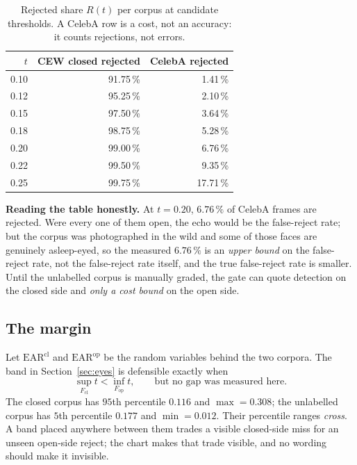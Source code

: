 \documentclass[11pt,a4paper]{article}
\begin{document}
\begin{table}[H]
\centering
\caption{Rejected share $R(t)$ per corpus at candidate thresholds. A
CelebA row is a cost, not an accuracy: it counts rejections, not errors.}
\label{tab:thresholds}
\renewcommand{\arraystretch}{1.25}
\begin{tabular}{@{}rrr@{}}
\toprule
$t$ & CEW closed rejected & CelebA rejected \\
\midrule
0.10 & 91.75\,\% & 1.41\,\%  \\
0.12 & 95.25\,\% & 2.10\,\%  \\
0.15 & 97.50\,\% & 3.64\,\%  \\
0.18 & 98.75\,\% & 5.28\,\%  \\
0.20 & 99.00\,\% & 6.76\,\%  \\
0.22 & 99.50\,\% & 9.35\,\%  \\
0.25 & 99.75\,\% & 17.71\,\% \\
\bottomrule
\end{tabular}
\end{table}

\begin{keybox}
\textbf{Reading the table honestly.} At $t=0.20$, $6.76\,\%$ of
CelebA frames are rejected. Were every one of them open, the echo would
be the false-reject rate; but the corpus was photographed in the wild
and some of those faces are genuinely asleep-eyed, so the measured
$6.76\,\%$ is an \emph{upper bound} on the false-reject rate, not the
false-reject rate itself, and the
true false-reject rate is smaller. Until the unlabelled corpus is
manually graded, the gate can quote detection on the closed side and
\emph{only a cost bound} on the open side.
\end{keybox}

\subsection{The margin}

Let $\mathrm{EAR}^{\text{cl}}$ and $\mathrm{EAR}^{\text{op}}$ be the
random variables behind the two corpora. The band in
Section~\ref{sec:eyes} is defensible exactly when
\begin{equation}
  \sup_{F_{\text{cl}}} t < \inf_{F_{\text{op}}} t,
  \qquad\text{but no gap was measured here.}
\end{equation}
The closed corpus has $95$th percentile $0.116$ and $\max=0.308$; the
unlabelled corpus has $5$th percentile $0.177$ and $\min=0.012$. Their
percentile ranges \emph{cross}. A band placed anywhere between them
trades a visible closed-side miss for an unseen open-side reject; the
chart makes that trade visible, and no wording should make it invisible.
\end{document}
